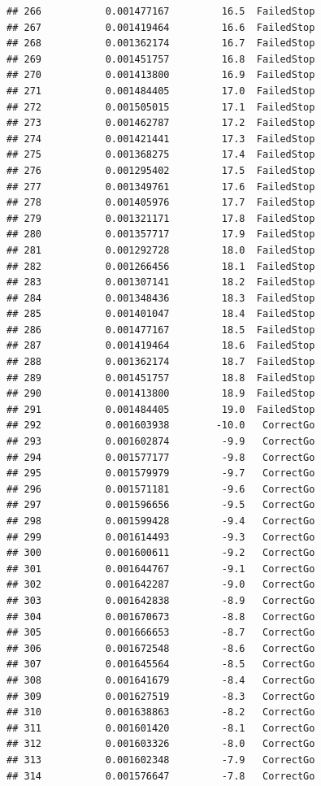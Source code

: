 \documentclass[
]{article}
\begin{document}
\begin{verbatim}
## 266           0.001477167         16.5  FailedStop
## 267           0.001419464         16.6  FailedStop
## 268           0.001362174         16.7  FailedStop
## 269           0.001451757         16.8  FailedStop
## 270           0.001413800         16.9  FailedStop
## 271           0.001484405         17.0  FailedStop
## 272           0.001505015         17.1  FailedStop
## 273           0.001462787         17.2  FailedStop
## 274           0.001421441         17.3  FailedStop
## 275           0.001368275         17.4  FailedStop
## 276           0.001295402         17.5  FailedStop
## 277           0.001349761         17.6  FailedStop
## 278           0.001405976         17.7  FailedStop
## 279           0.001321171         17.8  FailedStop
## 280           0.001357717         17.9  FailedStop
## 281           0.001292728         18.0  FailedStop
## 282           0.001266456         18.1  FailedStop
## 283           0.001307141         18.2  FailedStop
## 284           0.001348436         18.3  FailedStop
## 285           0.001401047         18.4  FailedStop
## 286           0.001477167         18.5  FailedStop
## 287           0.001419464         18.6  FailedStop
## 288           0.001362174         18.7  FailedStop
## 289           0.001451757         18.8  FailedStop
## 290           0.001413800         18.9  FailedStop
## 291           0.001484405         19.0  FailedStop
## 292           0.001603938        -10.0   CorrectGo
## 293           0.001602874         -9.9   CorrectGo
## 294           0.001577177         -9.8   CorrectGo
## 295           0.001579979         -9.7   CorrectGo
## 296           0.001571181         -9.6   CorrectGo
## 297           0.001596656         -9.5   CorrectGo
## 298           0.001599428         -9.4   CorrectGo
## 299           0.001614493         -9.3   CorrectGo
## 300           0.001600611         -9.2   CorrectGo
## 301           0.001644767         -9.1   CorrectGo
## 302           0.001642287         -9.0   CorrectGo
## 303           0.001642838         -8.9   CorrectGo
## 304           0.001670673         -8.8   CorrectGo
## 305           0.001666653         -8.7   CorrectGo
## 306           0.001672548         -8.6   CorrectGo
## 307           0.001645564         -8.5   CorrectGo
## 308           0.001641679         -8.4   CorrectGo
## 309           0.001627519         -8.3   CorrectGo
## 310           0.001638863         -8.2   CorrectGo
## 311           0.001601420         -8.1   CorrectGo
## 312           0.001603326         -8.0   CorrectGo
## 313           0.001602348         -7.9   CorrectGo
## 314           0.001576647         -7.8   CorrectGo

\end{verbatim}
\end{document}

